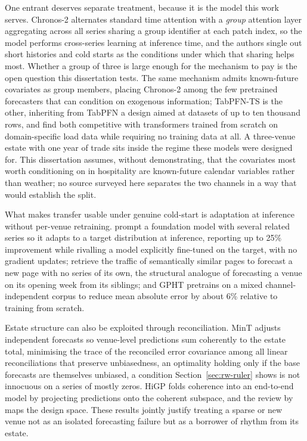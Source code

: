 One entrant deserves separate treatment, because it is the model this work
serves. Chronos-2 \citep[a 2025 preprint]{ansari_chronos-2_2025} alternates
standard time attention with a \emph{group} attention layer aggregating across
all series sharing a group identifier at each patch index, so the model performs
cross-series learning at inference time, and the authors single out short
histories and cold starts as the conditions under which that sharing helps most.
Whether a group of three is large enough for the mechanism to pay is the open
question this dissertation tests. The same mechanism admits known-future
covariates as group members, placing Chronos-2 among the few pretrained
forecasters that can condition on exogenous information; TabPFN-TS
\citep[a 2026 preprint]{hoo_tables_2026} is the other, inheriting from TabPFN
\citep{hollmann_accurate_2025} a design aimed at datasets of up to ten thousand
rows, and \citet{hertel_explainable_2026} find both competitive with transformers
trained from scratch on domain-specific load data while requiring no training
data at all. A three-venue estate with one year of trade sits inside the regime
these models were designed for. This dissertation assumes, without demonstrating,
that the covariates most worth conditioning on in hospitality are known-future
calendar variables rather than weather; no source surveyed here separates the two
channels in a way that would establish the split.

What makes transfer usable under genuine cold-start is adaptation at inference
without per-venue retraining. \citet{das_-context_2025} prompt a foundation model
with several related series so it adapts to a target distribution at inference,
reporting up to 25\% improvement while rivalling a model explicitly fine-tuned on
the target, with no gradient updates; \citet{zhou_context-driven_2025} retrieve
the traffic of semantically similar pages to forecast a new page with no series
of its own, the structural analogue of forecasting a venue on its opening week
from its siblings; and GPHT \citep{liu_generative_2024} pretrains on a mixed
channel-independent corpus to reduce mean absolute error by about 6\% relative to
training from scratch.

Estate structure can also be exploited through reconciliation. MinT
\citep{wickramasuriya_optimal_2019} adjusts independent forecasts so venue-level
predictions sum coherently to the estate total, minimising the trace of the
reconciled error covariance among all linear reconciliations that preserve
unbiasedness, an optimality holding only if the base forecasts are themselves
unbiased, a condition Section~\ref{sec:rw-ruler} shows is not innocuous on a
series of mostly zeros. HiGP \citep{cini_graph-based_2024} folds coherence into
an end-to-end model by projecting predictions onto the coherent subspace, and the
review by \citet{athanasopoulos_forecast_2024} maps the design space. These
results jointly justify treating a sparse or new venue not as an isolated
forecasting failure but as a borrower of rhythm from its estate.

